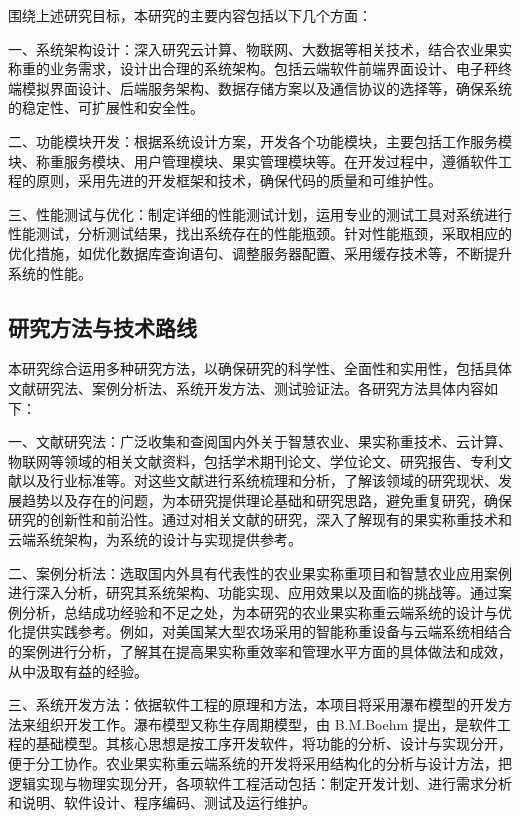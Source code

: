 \documentclass{xduugmr}
\begin{document}
围绕上述研究目标，本研究的主要内容包括以下几个方面：

一、系统架构设计：深入研究云计算、物联网、大数据等相关技术，结合农业果实称重的业务需求，设计出合理的系统架构。包括云端软件前端界面设计、电子秤终端模拟界面设计、后端服务架构、数据存储方案以及通信协议的选择等，确保系统的稳定性、可扩展性和安全性。

二、功能模块开发：根据系统设计方案，开发各个功能模块，主要包括工作服务模块、称重服务模块、用户管理模块、果实管理模块等。在开发过程中，遵循软件工程的原则，采用先进的开发框架和技术，确保代码的质量和可维护性。

三、性能测试与优化：制定详细的性能测试计划，运用专业的测试工具对系统进行性能测试，分析测试结果，找出系统存在的性能瓶颈。针对性能瓶颈，采取相应的优化措施，如优化数据库查询语句、调整服务器配置、采用缓存技术等，不断提升系统的性能。

\subsection{研究方法与技术路线}

本研究综合运用多种研究方法，以确保研究的科学性、全面性和实用性，包括具体文献研究法、案例分析法、系统开发方法、测试验证法。各研究方法具体内容如下：

一、文献研究法：广泛收集和查阅国内外关于智慧农业、果实称重技术、云计算、物联网等领域的相关文献资料，包括学术期刊论文、学位论文、研究报告、专利文献以及行业标准等。对这些文献进行系统梳理和分析，了解该领域的研究现状、发展趋势以及存在的问题，为本研究提供理论基础和研究思路，避免重复研究，确保研究的创新性和前沿性。通过对相关文献的研究，深入了解现有的果实称重技术和云端系统架构，为系统的设计与实现提供参考。

二、案例分析法：选取国内外具有代表性的农业果实称重项目和智慧农业应用案例进行深入分析，研究其系统架构、功能实现、应用效果以及面临的挑战等。通过案例分析，总结成功经验和不足之处，为本研究的农业果实称重云端系统的设计与优化提供实践参考。例如，对美国某大型农场采用的智能称重设备与云端系统相结合的案例\cite{Anisha2019FruitRU}进行分析，了解其在提高果实称重效率和管理水平方面的具体做法和成效，从中汲取有益的经验。

三、系统开发方法：依据软件工程的原理和方法，本项目将采用瀑布模型的开发方法来组织开发工作。瀑布模型又称生存周期模型，由 B.M.Boehm 提出，是软件工程的基础模型。其核心思想是按工序开发软件，将功能的分析、设计与实现分开，便于分工协作\cite{叶俊民2006软件工程}。农业果实称重云端系统的开发将采用结构化的分析与设计方法，把逻辑实现与物理实现分开，各项软件工程活动包括：制定开发计划、进行需求分析和说明、软件设计、程序编码、测试及运行维护。
\end{document}
